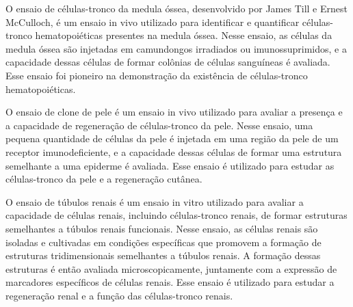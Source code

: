 \documentclass[11pt,a4paper]{article}
\begin{document}
	O ensaio de células-tronco da medula óssea, desenvolvido por James Till e Ernest McCulloch, é um ensaio in vivo utilizado para identificar e quantificar células-tronco hematopoiéticas presentes na medula óssea. Nesse ensaio, as células da medula óssea são injetadas em camundongos irradiados ou imunossuprimidos, e a capacidade dessas células de formar colônias de células sanguíneas é avaliada. Esse ensaio foi pioneiro na demonstração da existência de células-tronco hematopoiéticas.

	O ensaio de clone de pele é um ensaio in vivo utilizado para avaliar a presença e a capacidade de regeneração de células-tronco da pele. Nesse ensaio, uma pequena quantidade de células da pele é injetada em uma região da pele de um receptor imunodeficiente, e a capacidade dessas células de formar uma estrutura semelhante a uma epiderme é avaliada. Esse ensaio é utilizado para estudar as células-tronco da pele e a regeneração cutânea.

	O ensaio de túbulos renais é um ensaio in vitro utilizado para avaliar a capacidade de células renais, incluindo células-tronco renais, de formar estruturas semelhantes a túbulos renais funcionais. Nesse ensaio, as células renais são isoladas e cultivadas em condições específicas que promovem a formação de estruturas tridimensionais semelhantes a túbulos renais. A formação dessas estruturas é então avaliada microscopicamente, juntamente com a expressão de marcadores específicos de células renais. Esse ensaio é utilizado para estudar a regeneração renal e a função das células-tronco renais.



\end{document}

